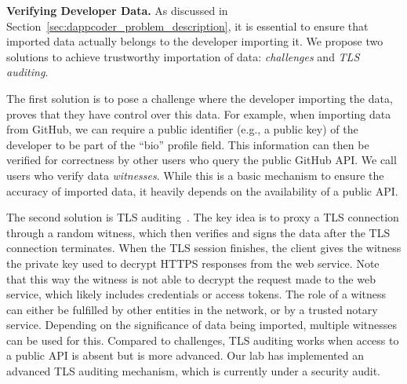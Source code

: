 \textbf{Verifying Developer Data.}
As discussed in Section~\ref{sec:dappcoder_problem_description}, it is essential to ensure that imported data actually belongs to the developer importing it.
We propose two solutions to achieve trustworthy importation of data: \textit{challenges} and \textit{TLS auditing}.

The first solution is to pose a challenge where the developer importing the data, proves that they have control over this data.
For example, when importing data from GitHub, we can require a public identifier (e.g., a public key) of the developer to be part of the \enquote{bio} profile field.
This information can then be verified for correctness by other users who query the public GitHub API.
We call users who verify data \emph{witnesses}.
While this is a basic mechanism to ensure the accuracy of imported data, it heavily depends on the availability of a public API.

The second solution is TLS auditing~\cite{tlsnotary2014whitepaper}.
The key idea is to proxy a TLS connection through a random witness, which then verifies and signs the data after the TLS connection terminates.
When the TLS session finishes, the client gives the witness the private key used to decrypt HTTPS responses from the web service.
Note that this way the witness is not able to decrypt the request made to the web service, which likely includes credentials or access tokens.
The role of a witness can either be fulfilled by other entities in the network, or by a trusted notary service.
Depending on the significance of data being imported, multiple witnesses can be used for this.
Compared to challenges, TLS auditing works when access to a public API is absent but is more advanced.
Our lab has implemented an advanced TLS auditing mechanism, which is currently under a security audit.

